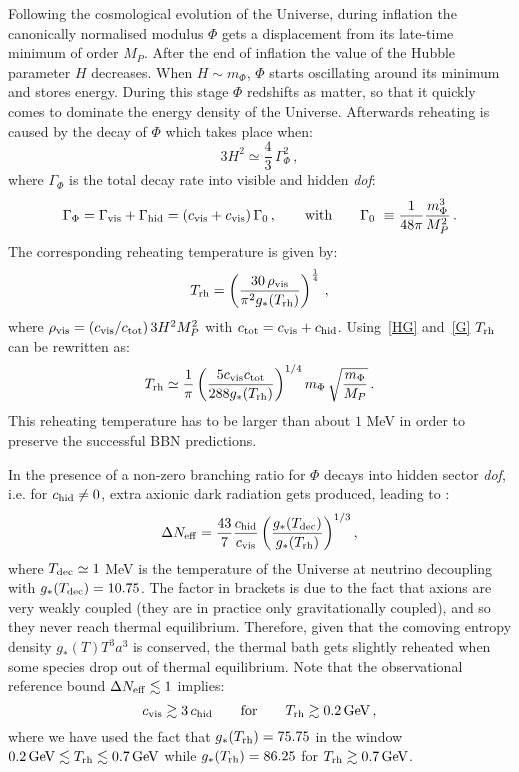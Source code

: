 \documentclass[11pt,a4paper]{article}
\newcommand{\be}{\begin{equation}}
\newcommand{\ee}{\end{equation}}
\begin{document}
Following the cosmological evolution of the Universe, during inflation the canonically normalised modulus $\Phi$ gets a displacement from its late-time minimum of order $M_P$. After the end of inflation the value of the Hubble parameter $H$ decreases. When $H \sim m_\Phi$, $\Phi$ starts oscillating around its minimum and stores energy. During this stage $\Phi$ redshifts as matter, so that it quickly comes to dominate the energy density of the Universe. Afterwards reheating is caused by the decay of $\Phi$ which takes place when:
\be
3 H^2 \simeq \frac43 \,\Gamma_\Phi^2\,,
\label{HG}
\ee
where $\Gamma_\Phi$ is the total decay rate into visible and hidden \textit{dof}:
\be
\Gamma_\Phi = \Gamma_{\rm vis} + \Gamma_{\rm hid} = \left(c_{\rm vis} + c_{\rm vis}\right) \Gamma_0\,,\qquad\text{with}
\qquad \Gamma_0~\equiv \frac{1}{48\pi}\frac{m_\Phi^3}{M_P^2}\,.
\label{G}
\ee
The corresponding reheating temperature is given by:
\be 
T_{\rm rh} = \left(\frac{30\,\rho_{\rm vis}}{\pi^2 g_*(T_{\rm rh})}\right)^{\frac 14}\,,
\label{Trh}
\ee
where $\rho_{\rm vis} = \left(c_{\rm vis}/c_{\rm tot}\right) 3 H^2 M_P^2$ with $c_{\rm tot}=c_{\rm vis} + c_{\rm hid}$. 
Using~\eqref{HG} and~\eqref{G} $T_{\rm rh}$ can be rewritten as:
\be
T_{\rm rh} \simeq \frac{1}{\pi} \left(\frac{5 c_{\rm vis} c_{\rm tot}}{288 g_*(T_{\rm rh})}\right)^{1/4} m_\Phi\,\sqrt{\frac{m_\Phi}{M_P}}\,.
\label{rt}
\ee
This reheating temperature has to be larger than about $1$ MeV in order to preserve the successful BBN predictions. 

In the presence of a non-zero branching ratio for $\Phi$ decays into hidden sector \textit{dof}, i.e. for $c_{\rm hid}\neq 0$, extra axionic dark radiation gets produced, leading to \cite{DR1, DR2}:
\be
\Delta N_{\rm eff} = \frac{43}{7} \frac{c_{\rm hid}}{c_{\rm vis}} \left(\frac{g_*(T_{\rm dec})}{g_*(T_{\rm rh})}\right)^{1/3},
\label{dn}
\ee
where $T_{\rm dec} \simeq 1$ MeV is the temperature of the Universe at neutrino decoupling with $g_*(T_{\rm dec}) = 10.75$. 
The factor in brackets is due to the fact that axions are very weakly coupled (they are in practice only gravitationally coupled), and so they never reach thermal equilibrium. Therefore, given that the comoving entropy density $g_*(T) T^3 a^3$ is conserved, the thermal bath gets slightly reheated when some species drop out of thermal equilibrium. Note that the observational reference bound $\Delta N_{\rm eff}\lesssim 1$ implies:
\be
c_{\rm vis}\gtrsim 3\, c_{\rm hid}\qquad\text{for}\qquad T_{\rm rh}\gtrsim 0.2\,\text{GeV}\,,
\label{cbound}
\ee
where we have used the fact that $g_*(T_{\rm rh}) = 75.75$ in the window $0.2\,{\rm GeV} \lesssim T_{\rm rh} \lesssim 0.7\, {\rm GeV}$ while $g_*(T_{\rm rh}) = 86.25$ for $T_{\rm rh} \gtrsim 0.7\,\rm GeV$.
\end{document}
